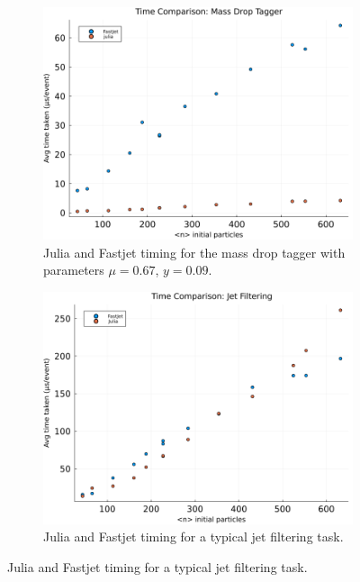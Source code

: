 \documentclass{webofc}
\begin{document}
\begin{figure}[ht]
    \begin{subfigure}{0.47\textwidth}
        \begin{center}
            \includegraphics[width=0.8\linewidth]{time-massdrop.png}
            \caption{Julia and Fastjet timing for the mass drop tagger with parameters $\mu=0.67$, $y=0.09$.}
            \label{fig:massdrop}
        \end{center}
    \end{subfigure}
    \hfill
    \begin{subfigure}{0.47\textwidth}
        \begin{center}
            \includegraphics[width=0.8\linewidth]{time-filter.png}
            \caption{Julia and Fastjet timing for a typical jet filtering task.}
            \label{fig:jetfilter}
        \end{center}
    \end{subfigure}
\end{figure}
\end{document}
